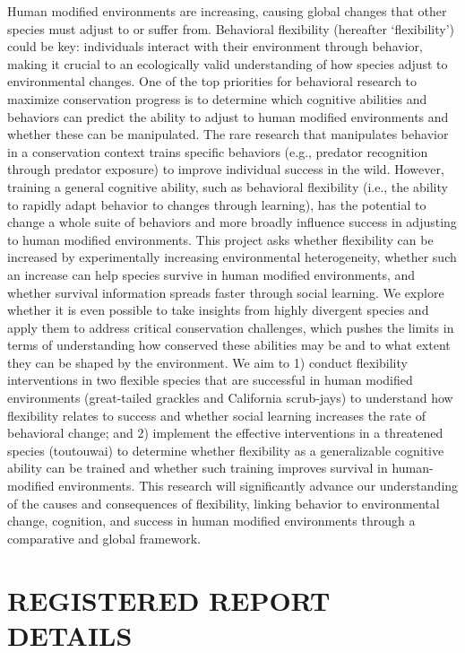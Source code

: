 \documentclass[
]{article}
\begin{document}
Human modified environments are increasing, causing global changes that
other species must adjust to or suffer from. Behavioral flexibility
(hereafter `flexibility') could be key: individuals interact with their
environment through behavior, making it crucial to an ecologically valid
understanding of how species adjust to environmental changes. One of the
top priorities for behavioral research to maximize conservation progress
is to determine which cognitive abilities and behaviors can predict the
ability to adjust to human modified environments and whether these can
be manipulated. The rare research that manipulates behavior in a
conservation context trains specific behaviors (e.g., predator
recognition through predator exposure) to improve individual success in
the wild. However, training a general cognitive ability, such as
behavioral flexibility (i.e., the ability to rapidly adapt behavior to
changes through learning), has the potential to change a whole suite of
behaviors and more broadly influence success in adjusting to human
modified environments. This project asks whether flexibility can be
increased by experimentally increasing environmental heterogeneity,
whether such an increase can help species survive in human modified
environments, and whether survival information spreads faster through
social learning. We explore whether it is even possible to take insights
from highly divergent species and apply them to address critical
conservation challenges, which pushes the limits in terms of
understanding how conserved these abilities may be and to what extent
they can be shaped by the environment. We aim to 1) conduct flexibility
interventions in two flexible species that are successful in human
modified environments (great-tailed grackles and California scrub-jays)
to understand how flexibility relates to success and whether social
learning increases the rate of behavioral change; and 2) implement the
effective interventions in a threatened species (toutouwai) to determine
whether flexibility as a generalizable cognitive ability can be trained
and whether such training improves survival in human-modified
environments. This research will significantly advance our understanding
of the causes and consequences of flexibility, linking behavior to
environmental change, cognition, and success in human modified
environments through a comparative and global framework.

\hypertarget{registered-report-details}{%
\section{REGISTERED REPORT DETAILS}\label{registered-report-details}}
\end{document}
